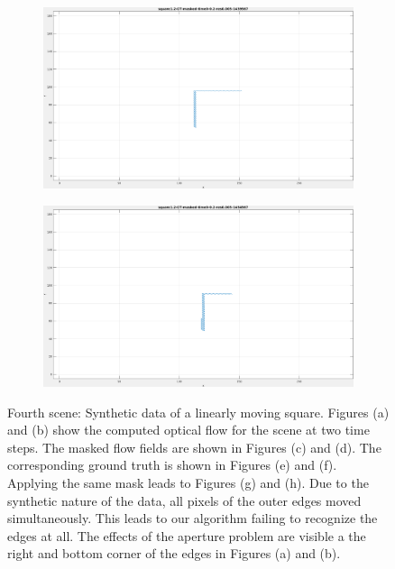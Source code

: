 \begin{appendix}
\begin{figure}[tb]
\begin{subfigure}{.45\textwidth}
  \caption{}
\end{subfigure}
\begin{subfigure}{.45\textwidth}
  \centering
  \includegraphics[height=.6\linewidth]{figs/square12/square12-GT-masked-1.png}
  \caption{}
\end{subfigure}
\begin{subfigure}{.45\textwidth}
  \centering
  \includegraphics[height=.6\linewidth]{figs/square12/square12-GT-masked-2.png}
  \caption{}
\end{subfigure}
\caption[Fourth scene: Synthetic data of a linearly moving square.]{Fourth scene: Synthetic data of a linearly moving square.
Figures (a) and (b) show the computed optical flow for the scene at two time steps. The masked flow fields are shown in Figures (c) and (d).
The corresponding ground truth is shown in Figures (e) and (f). Applying the same mask leads to Figures (g) and (h).
Due to the synthetic nature of the data, all pixels of the outer edges moved simultaneously.
This leads to our algorithm failing to recognize the edges at all.
The effects of the aperture problem are visible a the right and bottom corner of the edges in Figures (a) and (b).
}
\label{fig:app_square12-snapshots}
\end{figure}
	 

\end{appendix}
